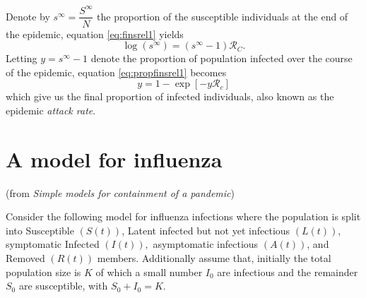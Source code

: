 \documentclass{book}\usepackage[]{graphicx}\usepackage[]{color}
\begin{document}
Denote by $s^\infty=\dfrac{S^\infty}{N}$ the proportion of the susceptible individuals at the end of the epidemic, equation \eqref{eq:finsrel1} yields
%
\begin{equation} \label{eq:propfinsrel1}
\log(s^\infty)=(s^\infty-1)\mathcal{R}_C.
\end{equation}
%
Letting $y=s^\infty-1$ denote the proportion of population infected over the course of the epidemic, equation \eqref{eq:propfinsrel1} becomes
\begin{equation} \label{eq:finalsize}
y=1-\exp[-y\mathcal{R}_c]
\end{equation}
which give us the final proportion of infected individuals, also known as the epidemic {\it attack rate}.

\section*{A model for influenza }
(from {\it Simple models for containment of a pandemic})

Consider the following model for influenza infections where the population is split into Susceptible $(S(t))$, Latent infected but not yet infectious $(L(t))$, symptomatic Infected $(I(t)),$ asymptomatic infectious $(A(t))$, and Removed $(R(t))$ members. 
Additionally assume that, initially the total population size is $K$ of which a small number $I_{0}$ are infectious and the remainder $S_{0}$ are susceptible, with $S_{0}+I_{0}=K .$
\end{document}
